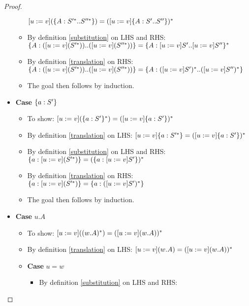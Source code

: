 \begin{proof}
\begin{itemize}
\begin{itemize}
                $[u := v](\{A : S'^{*} .. S''^{*}\}) =
                ([u := v]\{A : S' .. S''\})^{*}$
            \item By definition \ref{substitution} on LHS and RHS: \\
                $\{A : ([u := v](S'^{*})) .. ([u := v](S''^{*}))\}
                = \{A : [u := v]S' .. [u := v]S''\}^{*}$
            \item By definition \ref{translation} on RHS: \\
                $\{A : ([u := v](S'^{*})) .. ([u := v](S''^{*}))\}
                = \{A : ([u := v]S')^{*} .. ([u := v]S'')^{*}\}$
            \item The goal then follows by induction.
        \end{itemize}
        \item \textbf{Case} $\{a : S'\}$
        \begin{itemize}
            \item To show: $[u := v](\{a : S'\}^{*}) =
                ([u := v]\{a : S'\})^{*}$
            \item By definition \ref{translation} on LHS:
                $[u := v]\{a : S'^{*}\} = ([u := v]\{a : S'\})^{*}$
            \item By definition \ref{substitution} on LHS and RHS:
                $\{a : [u := v](S'^{*})\} =
                (\{a : [u := v]S'\})^{*}$
            \item By definition \ref{translation} on RHS:
                $\{a : [u := v](S'^{*})\} =
                \{a : ([u := v]S')^{*}\}$
            \item The goal then follows by induction.
        \end{itemize}
        \item \textbf{Case} $u.A$
        \begin{itemize}
            \item To show: $[u := v]((w.A)^{*}) =
                ([u := v](w.A))^{*}$
            \item By definition \ref{translation} on LHS:
                $[u := v](w.A) = ([u := v](w.A))^{*}$
            \item \textbf{Case} $u = w$
            \begin{itemize}
                \item By definition \ref{substitution} on LHS and RHS:

\end{itemize}
\end{itemize}
\end{itemize}
\end{proof}
